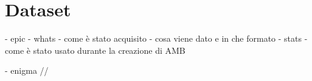 \chapter{Dataset}

- epic
    - whats
        - come è stato acquisito
        - cosa viene dato e in che formato
    - stats
    - come è stato usato durante la creazione di AMB

- enigma
    //
